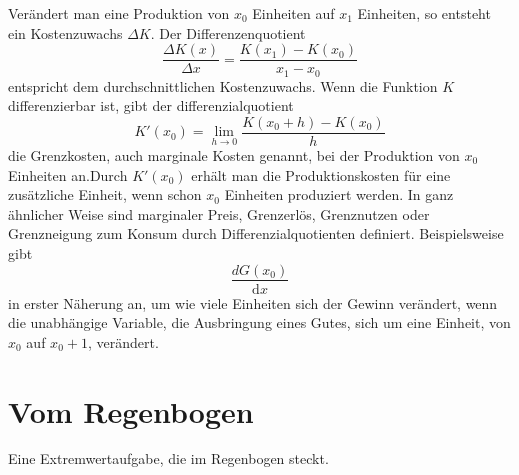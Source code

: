 \documentclass[%
11pt,%
twoside,%
titlepage,%
german,%
headsepline%
]{scrartcl}
\theoremstyle{definition}
\theoremstyle{plain}
\begin{document}
Verändert man eine Produktion von $x_0$ Einheiten auf $x_1$ Einheiten, so entsteht ein Kostenzuwachs $\Delta K$. Der Differenzenquotient
$$\frac{\Delta K(x)}{\Delta x}=\frac{K(x_1)-K(x_0)}{x_1-x_0}$$
entspricht dem durchschnittlichen Kostenzuwachs.
Wenn die Funktion $K$ differenzierbar ist, gibt der differenzialquotient
$$K'(x_0)=\lim_{h\to0}\frac{K(x_0+h)-K(x_0)}{h}$$
die Grenzkosten, auch marginale Kosten genannt, bei der Produktion von $x_0$ Einheiten an.Durch $K'(x_0)$ erhält man die Produktionskosten für eine zusätzliche Einheit, wenn schon $x_0$ Einheiten produziert werden.
In ganz ähnlicher Weise sind marginaler Preis, Grenzerlös, Grenznutzen oder Grenzneigung zum Konsum durch Differenzialquotienten definiert. Beispielsweise gibt
$$\frac{dG(x_0)}{\mathrm{d}x}$$
in erster Näherung an, um wie viele Einheiten sich der Gewinn verändert, wenn die unabhängige Variable, die Ausbringung eines Gutes, sich um eine Einheit, von $x_0$ auf $x_0 + 1$, verändert.

\clearpage

\section{Vom Regenbogen}
Eine Extremwertaufgabe, die im Regenbogen steckt.


\cleardoublepage
\listoffigures
\listoftables
\end{document}
